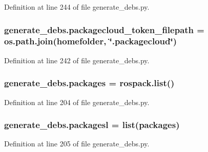 Definition at line 244 of file generate\+\_\+debs.\+py.

\subsubsection[{\texorpdfstring{packagecloud\+\_\+token\+\_\+filepath}{packagecloud_token_filepath}}]{\setlength{\rightskip}{0pt plus 5cm}generate\+\_\+debs.\+packagecloud\+\_\+token\+\_\+filepath = os.\+path.\+join({\bf homefolder}, \char`\"{}.packagecloud\char`\"{})}\hypertarget{namespacegenerate__debs_a836a20b989c3c8e46255d91d10cb524f}{}\label{namespacegenerate__debs_a836a20b989c3c8e46255d91d10cb524f}


Definition at line 242 of file generate\+\_\+debs.\+py.

\subsubsection[{\texorpdfstring{packages}{packages}}]{\setlength{\rightskip}{0pt plus 5cm}generate\+\_\+debs.\+packages = rospack.\+list()}\hypertarget{namespacegenerate__debs_a40d4732827c5678f3f48354238245e1d}{}\label{namespacegenerate__debs_a40d4732827c5678f3f48354238245e1d}


Definition at line 204 of file generate\+\_\+debs.\+py.

\subsubsection[{\texorpdfstring{packagesl}{packagesl}}]{\setlength{\rightskip}{0pt plus 5cm}generate\+\_\+debs.\+packagesl = list({\bf packages})}\hypertarget{namespacegenerate__debs_acac340506bc1d8ca0d0881b9c00bfea2}{}\label{namespacegenerate__debs_acac340506bc1d8ca0d0881b9c00bfea2}


Definition at line 205 of file generate\+\_\+debs.\+py.

